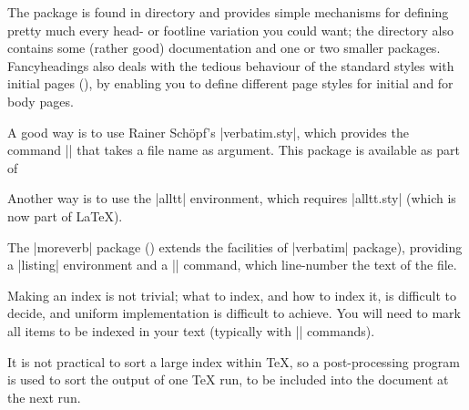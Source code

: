 The package is found in directory  and provides
simple mechanisms for defining pretty much every head- or footline
variation you could want; the directory also contains some (rather
good) documentation and one or two smaller packages.  Fancyheadings
also deals with the tedious behaviour of the standard styles with
initial pages (), by enabling you to define
different page styles for initial and for body pages.


A good way is to use Rainer Sch\"opf's \File|verbatim.sty|,
which provides the command || that takes a file name
as argument. This package is available as part of 

Another way is to use the |alltt| environment, which requires
\File|alltt.sty| (which is now part of \LaTeX{}).

The \File|moreverb| package () extends the
facilities of \File|verbatim| package), providing a |listing|
environment and a |\listinginput| command, which line-number the text
of the file.


Making an index is not trivial; what to index, and how to index it, is
difficult to decide, and uniform implementation is difficult to
achieve.  You will need to mark all items to be indexed in your text
(typically with |\index| commands).

It is not practical to sort
a large index within \TeX{}, so a post-processing program is used to sort
the output of one \TeX{} run, to be included into the document at the
next run.

